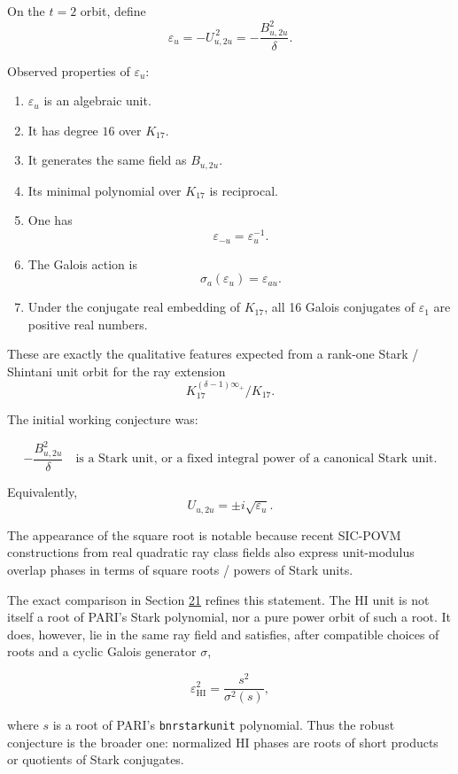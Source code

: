 \documentclass[11pt,reqno]{amsart}
\theoremstyle{plain}
\begin{document}
On the \(t=2\) orbit, define
\[
\boxed{
\varepsilon_u
=
-U_{u,2u}^{\,2}
=
-\frac{B_{u,2u}^2}{\delta}.
}
\]

Observed properties of \(\varepsilon_u\):

\begin{enumerate}
\item \(\varepsilon_u\) is an algebraic unit.
\item It has degree \(16\) over \(K_{17}\).
\item It generates the same field as \(B_{u,2u}\).
\item Its minimal polynomial over \(K_{17}\) is reciprocal.
\item One has
\[
 \varepsilon_{-u}=\varepsilon_u^{-1}.
\]
\item The Galois action is
\[
 \sigma_a(\varepsilon_u)=\varepsilon_{au}.
\]
\item Under the conjugate real embedding of \(K_{17}\), all 16 Galois conjugates of \(\varepsilon_1\) are positive real numbers.
\end{enumerate}

These are exactly the qualitative features expected from a rank-one Stark / Shintani unit orbit for the ray extension
\[
K_{17}^{(\delta-1)\infty_+}/K_{17}.
\]

The initial working conjecture was:

\[
\boxed{
-\frac{B_{u,2u}^2}{\delta}
\quad\text{is a Stark unit, or a fixed integral power of a canonical Stark unit.}
}
\]

Equivalently,
\[
\boxed{
U_{u,2u}
=
\pm i\sqrt{\varepsilon_u}.
}
\]

The appearance of the square root is notable because recent SIC-POVM constructions from real quadratic ray class fields also express unit-modulus overlap phases in terms of square roots / powers of Stark units.

The exact comparison in Section \hyperref[sec:21]{21} refines this statement. The HI unit is not itself a root of PARI's Stark polynomial, nor a pure power orbit of such a root. It does, however, lie in the same ray field and satisfies, after compatible choices of roots and a cyclic Galois generator \(\sigma\),

\[
\boxed{
\varepsilon_{\mathrm{HI}}^2
=
\frac{s^2}{\sigma^2(s)},
}
\]

where \(s\) is a root of PARI's \texttt{bnrstarkunit} polynomial. Thus the robust conjecture is the broader one: normalized HI phases are roots of short products or quotients of Stark conjugates.
\end{document}
